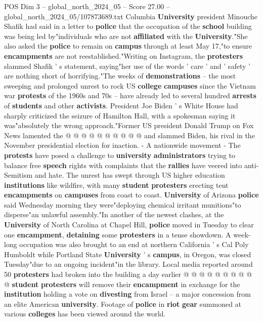 \begin{textsample}{POS Dim 3 – global\_north\_2024\_05 – Score 27.00 – global\_north\_2024\_05/107873689.txt}
Columbia \textbf{University} president Minouche Shafik had said in a letter to \textbf{police} that the occupation of the \textbf{school} building was being led by"individuals who are not \textbf{affiliated} with the \textbf{University}."She also asked the \textbf{police} to remain on \textbf{campus} through at least May 17,"to ensure \textbf{encampments} are not reestablished."Writing on Instagram, the \textbf{protesters} slammed Shafik ' s statement, saying"her use of the words ' care ' and ' safety ' are nothing short of horrifying."The weeks of \textbf{demonstrations} -- the most sweeping and prolonged unrest to rock US \textbf{college} \textbf{campuses} since the Vietnam war \textbf{protests} of the 1960s and 70s -- have already led to several hundred \textbf{arrests} of \textbf{students} and other \textbf{activists}.
President Joe Biden ' s White House had sharply criticized the seizure of Hamilton Hall, with a spokesman saying it was"absolutely the wrong approach."Former US president Donald Trump on Fox News lamented the @ @ @ @ @ @ @ @ @ @ and slammed Biden, his rival in the November presidential election for inaction. - A nationwide movement - The \textbf{protests} have posed a challenge to \textbf{university} \textbf{administrators} trying to balance free \textbf{speech} rights with complaints that the \textbf{rallies} have veered into anti-Semitism and hate.
The unrest has swept through US higher education \textbf{institutions} like wildfire, with many \textbf{student} \textbf{protesters} erecting tent \textbf{encampments} on \textbf{campuses} from coast to coast. \textbf{University} of Arizona \textbf{police} said Wednesday morning they were"deploying chemical irritant munitions"to disperse"an unlawful assembly."In another of the newest clashes, at the \textbf{University} of North Carolina at Chapel Hill, \textbf{police} moved in Tuesday to clear one \textbf{encampment}, \textbf{detaining} some \textbf{protesters} in a tense showdown.
A week-long occupation was also brought to an end at northern California ' s Cal Poly Humboldt while Portland State \textbf{University} ' s \textbf{campus}, in Oregon, was closed Tuesday"due to an ongoing incident"in the library.
Local media reported around 50 \textbf{protesters} had broken into the building a day earlier @ @ @ @ @ @ @ @ @ @ \textbf{student} \textbf{protesters} will remove their \textbf{encampment} in exchange for the \textbf{institution} holding a vote on \textbf{divesting} from Israel -- a major concession from an elite American \textbf{university}.
Footage of \textbf{police} in \textbf{riot} \textbf{gear} summoned at various \textbf{colleges} has been viewed around the world.

\end{textsample}
